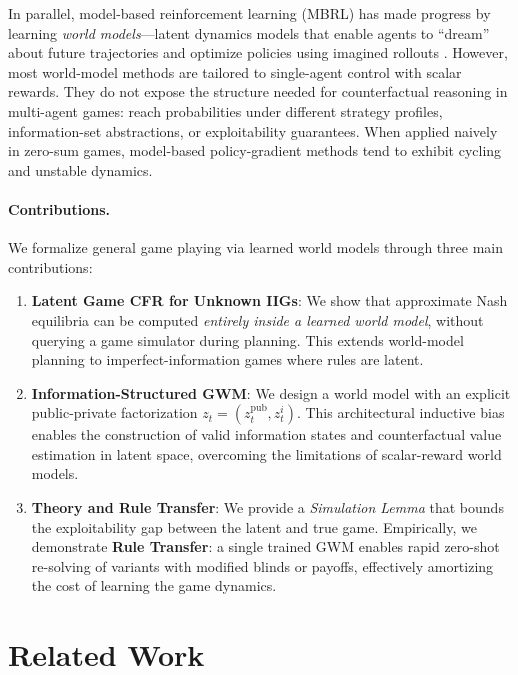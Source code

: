 \documentclass{article}
\begin{document}
In parallel, model-based reinforcement learning (MBRL) has made progress by learning \emph{world models}---latent dynamics models that enable agents to ``dream'' about future trajectories and optimize policies using imagined rollouts \cite{ha2018worldmodels,hafner2019dreamer}. However, most world-model methods are tailored to single-agent control with scalar rewards. They do not expose the structure needed for counterfactual reasoning in multi-agent games: reach probabilities under different strategy profiles, information-set abstractions, or exploitability guarantees. When applied naively in zero-sum games, model-based policy-gradient methods tend to exhibit cycling and unstable dynamics.

\paragraph{Contributions.}
We formalize general game playing via learned world models through three main contributions:
\begin{enumerate}
    \item \textbf{Latent Game CFR for Unknown IIGs}: We show that approximate Nash equilibria can be computed \emph{entirely inside a learned world model}, without querying a game simulator during planning. This extends world-model planning to imperfect-information games where rules are latent.
    \item \textbf{Information-Structured GWM}: We design a world model with an explicit public-private factorization $z_t = (z_t^\text{pub}, z_t^i)$. This architectural inductive bias enables the construction of valid information states and counterfactual value estimation in latent space, overcoming the limitations of scalar-reward world models.
    \item \textbf{Theory and Rule Transfer}: We provide a \emph{Simulation Lemma} that bounds the exploitability gap between the latent and true game. Empirically, we demonstrate \textbf{Rule Transfer}: a single trained GWM enables rapid zero-shot re-solving of variants with modified blinds or payoffs, effectively amortizing the cost of learning the game dynamics.
\end{enumerate}

\section{Related Work}
\label{sec:related}
\end{document}
